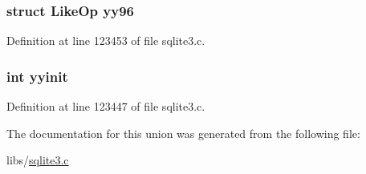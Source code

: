 \subsubsection[{yy96}]{\setlength{\rightskip}{0pt plus 5cm}struct {\bf Like\+Op} yy96}\label{union_y_y_m_i_n_o_r_t_y_p_e_a2f23d14f37b365fa5cce1bd83276b6fd}


Definition at line 123453 of file sqlite3.\+c.

\hypertarget{union_y_y_m_i_n_o_r_t_y_p_e_a0cb008d540fdfbd8d959086ac51430d9}{}
\subsubsection[{yyinit}]{\setlength{\rightskip}{0pt plus 5cm}int yyinit}\label{union_y_y_m_i_n_o_r_t_y_p_e_a0cb008d540fdfbd8d959086ac51430d9}


Definition at line 123447 of file sqlite3.\+c.



The documentation for this union was generated from the following file\+:\begin{DoxyCompactItemize}
\item 
libs/\hyperlink{sqlite3_8c}{sqlite3.\+c}\end{DoxyCompactItemize}
